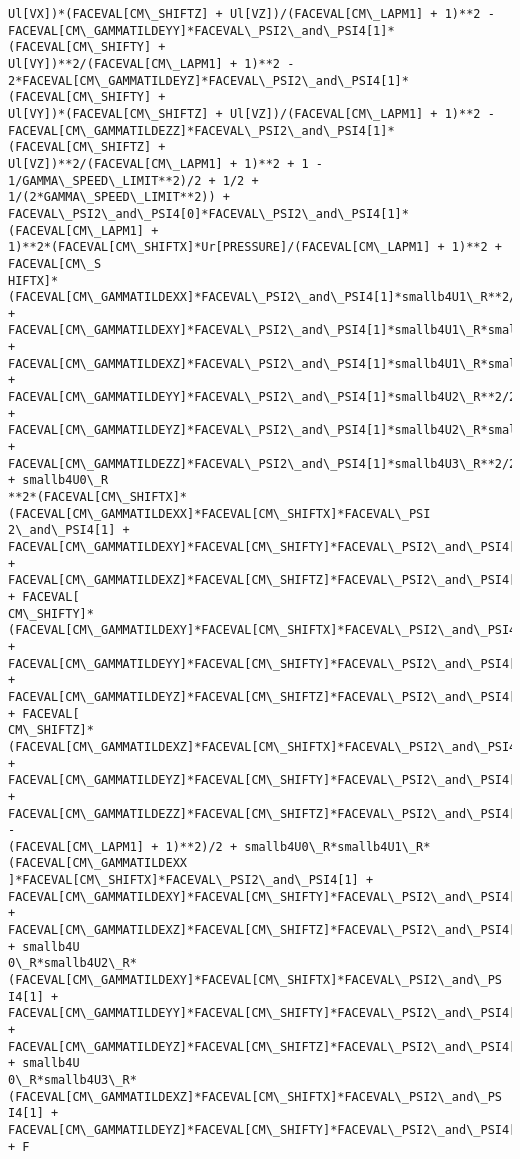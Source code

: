 \documentclass[landscape,letterpaper,10pt,english]{article}
\begin{document}
\begin{Verbatim}[commandchars=\\\{\}]
Ul[VX])*(FACEVAL[CM\_SHIFTZ] + Ul[VZ])/(FACEVAL[CM\_LAPM1] + 1)**2 -
FACEVAL[CM\_GAMMATILDEYY]*FACEVAL\_PSI2\_and\_PSI4[1]*(FACEVAL[CM\_SHIFTY] +
Ul[VY])**2/(FACEVAL[CM\_LAPM1] + 1)**2 -
2*FACEVAL[CM\_GAMMATILDEYZ]*FACEVAL\_PSI2\_and\_PSI4[1]*(FACEVAL[CM\_SHIFTY] +
Ul[VY])*(FACEVAL[CM\_SHIFTZ] + Ul[VZ])/(FACEVAL[CM\_LAPM1] + 1)**2 -
FACEVAL[CM\_GAMMATILDEZZ]*FACEVAL\_PSI2\_and\_PSI4[1]*(FACEVAL[CM\_SHIFTZ] +
Ul[VZ])**2/(FACEVAL[CM\_LAPM1] + 1)**2 + 1 - 1/GAMMA\_SPEED\_LIMIT**2)/2 + 1/2 +
1/(2*GAMMA\_SPEED\_LIMIT**2)) +
FACEVAL\_PSI2\_and\_PSI4[0]*FACEVAL\_PSI2\_and\_PSI4[1]*(FACEVAL[CM\_LAPM1] +
1)**2*(FACEVAL[CM\_SHIFTX]*Ur[PRESSURE]/(FACEVAL[CM\_LAPM1] + 1)**2 + FACEVAL[CM\_S
HIFTX]*(FACEVAL[CM\_GAMMATILDEXX]*FACEVAL\_PSI2\_and\_PSI4[1]*smallb4U1\_R**2/2 +
FACEVAL[CM\_GAMMATILDEXY]*FACEVAL\_PSI2\_and\_PSI4[1]*smallb4U1\_R*smallb4U2\_R +
FACEVAL[CM\_GAMMATILDEXZ]*FACEVAL\_PSI2\_and\_PSI4[1]*smallb4U1\_R*smallb4U3\_R +
FACEVAL[CM\_GAMMATILDEYY]*FACEVAL\_PSI2\_and\_PSI4[1]*smallb4U2\_R**2/2 +
FACEVAL[CM\_GAMMATILDEYZ]*FACEVAL\_PSI2\_and\_PSI4[1]*smallb4U2\_R*smallb4U3\_R +
FACEVAL[CM\_GAMMATILDEZZ]*FACEVAL\_PSI2\_and\_PSI4[1]*smallb4U3\_R**2/2 + smallb4U0\_R
**2*(FACEVAL[CM\_SHIFTX]*(FACEVAL[CM\_GAMMATILDEXX]*FACEVAL[CM\_SHIFTX]*FACEVAL\_PSI
2\_and\_PSI4[1] +
FACEVAL[CM\_GAMMATILDEXY]*FACEVAL[CM\_SHIFTY]*FACEVAL\_PSI2\_and\_PSI4[1] +
FACEVAL[CM\_GAMMATILDEXZ]*FACEVAL[CM\_SHIFTZ]*FACEVAL\_PSI2\_and\_PSI4[1]) + FACEVAL[
CM\_SHIFTY]*(FACEVAL[CM\_GAMMATILDEXY]*FACEVAL[CM\_SHIFTX]*FACEVAL\_PSI2\_and\_PSI4[1]
+ FACEVAL[CM\_GAMMATILDEYY]*FACEVAL[CM\_SHIFTY]*FACEVAL\_PSI2\_and\_PSI4[1] +
FACEVAL[CM\_GAMMATILDEYZ]*FACEVAL[CM\_SHIFTZ]*FACEVAL\_PSI2\_and\_PSI4[1]) + FACEVAL[
CM\_SHIFTZ]*(FACEVAL[CM\_GAMMATILDEXZ]*FACEVAL[CM\_SHIFTX]*FACEVAL\_PSI2\_and\_PSI4[1]
+ FACEVAL[CM\_GAMMATILDEYZ]*FACEVAL[CM\_SHIFTY]*FACEVAL\_PSI2\_and\_PSI4[1] +
FACEVAL[CM\_GAMMATILDEZZ]*FACEVAL[CM\_SHIFTZ]*FACEVAL\_PSI2\_and\_PSI4[1]) -
(FACEVAL[CM\_LAPM1] + 1)**2)/2 + smallb4U0\_R*smallb4U1\_R*(FACEVAL[CM\_GAMMATILDEXX
]*FACEVAL[CM\_SHIFTX]*FACEVAL\_PSI2\_and\_PSI4[1] +
FACEVAL[CM\_GAMMATILDEXY]*FACEVAL[CM\_SHIFTY]*FACEVAL\_PSI2\_and\_PSI4[1] +
FACEVAL[CM\_GAMMATILDEXZ]*FACEVAL[CM\_SHIFTZ]*FACEVAL\_PSI2\_and\_PSI4[1]) + smallb4U
0\_R*smallb4U2\_R*(FACEVAL[CM\_GAMMATILDEXY]*FACEVAL[CM\_SHIFTX]*FACEVAL\_PSI2\_and\_PS
I4[1] + FACEVAL[CM\_GAMMATILDEYY]*FACEVAL[CM\_SHIFTY]*FACEVAL\_PSI2\_and\_PSI4[1] +
FACEVAL[CM\_GAMMATILDEYZ]*FACEVAL[CM\_SHIFTZ]*FACEVAL\_PSI2\_and\_PSI4[1]) + smallb4U
0\_R*smallb4U3\_R*(FACEVAL[CM\_GAMMATILDEXZ]*FACEVAL[CM\_SHIFTX]*FACEVAL\_PSI2\_and\_PS
I4[1] + FACEVAL[CM\_GAMMATILDEYZ]*FACEVAL[CM\_SHIFTY]*FACEVAL\_PSI2\_and\_PSI4[1] + F

\end{Verbatim}
\end{document}
